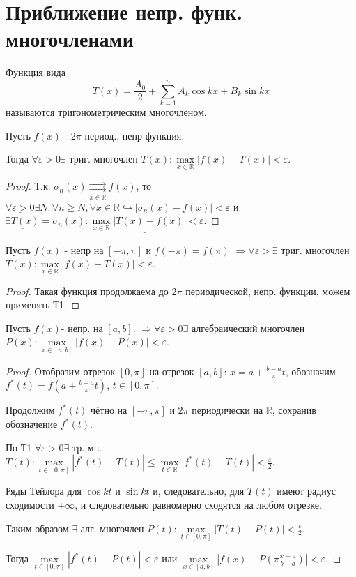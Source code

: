 \documentclass{article}
\theoremstyle{definition}
\numberwithin{theorem}{section}
\numberwithin{lemma}{section}
\numberwithin{definition}{section}
\numberwithin{corollary}{section}
\numberwithin{equation}{section}
\let\epsilon\varepsilon
\let\implies\Rightarrow
\let\true\hookrightarrow
\newcommand\R{\ensuremath{\mathbb{R}}}
\begin{document}
\section{Приближение непр. функ. многочленами}
\begin{definition}
  Функция вида
  \[
    T(x)=\frac{A_0}{2}+\sum_{k=1}^{n}A_k\cos kx + B_k \sin kx
  \]
  называются тригонометрическим многочленом.
\end{definition}
\begin{theorem}[Т1 Веерштрасса]
  Пусть $f(x)$ - $2\pi$ период., непр функция.

  Тогда $\forall \epsilon>0 \exists$ триг. многочлен $T(x): \max \limits_{x\in \R} |f(x)-T(x)| < \epsilon$.
\end{theorem}
\begin{proof}
  Т.к. $\sigma_n(x)\underset{x\in \R}{\rightrightarrows} f(x)$,
  то $\underline{\forall \epsilon >0} \exists N : \forall n\ge N, \forall x\in \R \true |\sigma_n(x)-f(x)|<\epsilon$
  и $\underline{\exists T(x)}=\sigma_n(x)\underline{:\max\limits_{x\in \R} |T(x)-f(x)|<\epsilon}$.
\end{proof}
\begin{theorem}[Т1' (перефразирование)]
  Пусть $f(x)$ - непр на $[-\pi,\pi]$ и $f(-\pi)=f(\pi)$
  $\implies \forall \epsilon > \exists$ триг. многочлен $T(x): \max \limits_{x\in \R} |f(x)-T(x)| < \epsilon$.
\end{theorem}
\begin{proof}
  Такая функция продолжаема до $2\pi$ периодической, непр. функции, можем применять Т1.
\end{proof}
\begin{theorem}[Т2 Веерштрасса]
  Пусть $f(x)$- непр. на $[a,b]$.
  $\implies \forall \epsilon>0 \exists$ алгебраический многочлен
  $P(x):\max \limits_{x\in[a,b]}|f(x)-P(x)|<\epsilon$.
\end{theorem}
\begin{proof}
  Отобразим отрезок $[0,\pi]$ на отрезок $[a,b]$:
  $x=a+\frac{b-a}{\pi}t$, обозначим $f^{*}(t)=f(a+\frac{b-a}{\pi}t)$, $t\in[0,\pi]$.

  Продолжим $f^{*}(t)$ чётно на $[-\pi,\pi]$ и $2\pi$ периодически на $\R$,
  сохранив обозначение $f^{*}(t)$.

  По Т1 $\forall \epsilon>0 \exists$ тр. мн.
  $T(t): \max \limits_{t\in[0,\pi]}|f^{*}(t)-T(t)| \le \max \limits_{t\in \R}|f^{*}(t)-T(t)| < \frac{\epsilon}{2}$.

  Ряды Тейлора для $\cos kt$ и $\sin kt$ и, следовательно, для $T(t)$
  имеют радиус сходимости $+\infty$, и следовательно равномерно сходятся на любом отрезке.
  
  Таким образом $\exists$ алг. многочлен $P(t):\max\limits_{t\in[0,\pi]} |T(t)-P(t)|<\frac{\epsilon}{2}$.

  Тогда $\max \limits_{t\in[0,\pi]}|f^{*}(t)-P(t)|< \epsilon$ или 
  $\max \limits_{x\in[a,b]} |f(x)-P(\pi\frac{x-a}{b-a})|<\epsilon$.
\end{proof}
\end{document}
